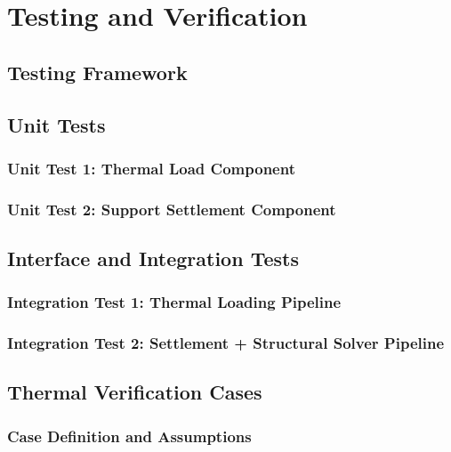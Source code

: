 \chapter{Testing and Verification}

\section{Testing Framework}

\section{Unit Tests}
\subsection{Unit Test 1: Thermal Load Component}

\subsection{Unit Test 2: Support Settlement Component}

\section{Interface and Integration Tests}
\subsection{Integration Test 1: Thermal Loading Pipeline}

\subsection{Integration Test 2: Settlement + Structural Solver Pipeline}

\section{Thermal Verification Cases}
\subsection{Case Definition and Assumptions}

